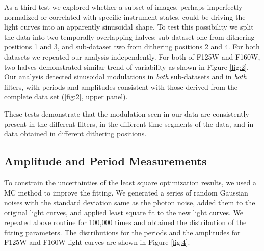 \documentclass[apj]{emulateapj}
\begin{document}
As a third test we explored whether a subset of images, perhaps
imperfectly normalized or correlated with specific instrument states,
could be driving the light curves into an apparently sinusoidal
shape. To test this possibility we split the data into two temporally
overlapping halves: sub-dataset one from dithering positions 1 and 3,
and sub-dataset two from dithering positions 2 and 4. For both
datasets we repeated our analysis independently.  For both of F125W
and F160W, two halves demonstrated similar trend of variability as
shown in Figure \ref{fig:2}.  Our analysis detected sinusoidal
modulations in {\em both} sub-datasets and in {\em both} filters, with
periods and amplitudes consistent with those derived from the complete
data set (\ref{fig:2}, upper panel).
 
 These tests demonstrate that the modulation seen in our data are
 consistently present in the different filters, in the different time
 segments of the data, and in data obtained in different dithering
 positions.
 






\subsection{Amplitude and Period Measurements}

To constrain the uncertainties of the least square optimization
results, we used a MC method to improve the fitting. We
generated a series of random Gaussian noises with the standard deviation same as
the photon noise, added them to the original light curves, and applied
least square fit to the new light curves. We repeated above routine for 100,000 times and obtained
the distribution of the fitting parameters. The distributions for the
periods and the amplitudes for F125W and F160W light curves are
shown in Figure \ref{fig:4}.
\end{document}
